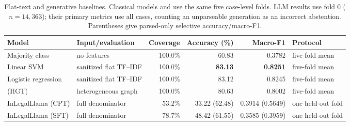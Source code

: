 \begin{table}[!htbp]
\centering
\caption{Flat-text and generative baselines. Classical models and \method{} use the same five case-level folds. LLM results use fold 0 ($n=14{,}363$); their primary metrics use all cases, counting an unparseable generation as an incorrect abstention. Parentheses give parsed-only selective accuracy/macro-F1.}
\label{tab:r6-02-baselines}
\setlength{\tabcolsep}{4pt}
\scriptsize
\begin{adjustbox}{max width=\textwidth}
\begin{tabular}{l l r r r l}
\toprule
Model & Input/evaluation & Coverage & Accuracy (\%) & Macro-F1 & Protocol \\
\midrule
Majority class & no features & 100.0\% & 60.83 & 0.3782 & five-fold mean \\
Linear SVM & sanitized flat TF--IDF & 100.0\% & \textbf{83.13} & \textbf{0.8251} & five-fold mean \\
Logistic regression & sanitized flat TF--IDF & 100.0\% & 83.12 & 0.8245 & five-fold mean \\
\method{} (HGT) & heterogeneous graph & 100.0\% & 80.63 & 0.8002 & five-fold mean \\
\midrule
InLegalLlama (CPT) & full denominator & 53.2\% & 33.22 (62.48) & 0.3914 (0.5649) & one held-out fold \\
InLegalLlama (SFT) & full denominator & 78.7\% & 48.42 (61.55) & 0.3585 (0.3959) & one held-out fold \\
\bottomrule
\end{tabular}
\end{adjustbox}
\end{table}
